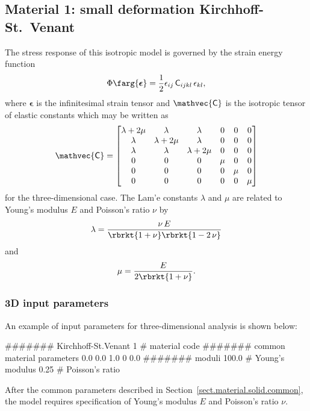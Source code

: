 \subsection{Material 1: small deformation Kirchhoff-St.~Venant}
\label{sect.mat.SSKStV}
The stress response of this isotropic model is 
governed by the strain energy function
\begin{equation}
\Phi\farg{\boldsymbol{\epsilon}}=
\frac{1}{2} \epsilon_{ij}\,\mathsf{C}_{ijkl}\,\epsilon_{kl},
\end{equation}
where $\boldsymbol{\epsilon}$ is the infinitesimal strain tensor
and $\mathvec{\mathsf{C}}$
is the isotropic tensor of elastic constants which may be
written as
\begin{equation}
\label{eq.modulus.isotropic}
	\mathvec{\mathsf{C}} =
	\begin{bmatrix}
		\lambda + 2 \mu & \lambda & \lambda & 0 & 0 & 0 \\
		\lambda & \lambda + 2 \mu & \lambda & 0 & 0 & 0 \\
		\lambda & \lambda & \lambda + 2 \mu & 0 & 0 & 0 \\
		0 & 0 & 0 & \mu & 0 & 0 \\
		0 & 0 & 0 & 0 & \mu & 0 \\
		0 & 0 & 0 & 0 & 0 & \mu
	\end{bmatrix}
\end{equation}
for the three-dimensional case. The Lam\a'e constants $\lambda$ and 
$\mu$ are related to Young's modulus $E$ 
and Poisson's ratio $\nu$ by
\begin{equation}
\label{eq.lambda}
\lambda = \frac{\nu\,E}{\rbrkt{1 + \nu}\rbrkt{1 - 2\,\nu}}
\end{equation}
and
\begin{equation}
\label{eq.mu}
\mu = \frac{E}{2 \rbrkt{1 + \nu}}.
\end{equation}

\subsubsection{3D input parameters}
An example of input parameters for three-dimensional analysis is shown 
below:
\begin{inputfile}
####### Kirchhoff-St.Venant
1     # material code
####### common material parameters
0.0    0.0    1.0
0      0.0
####### moduli
100.0 # Young's modulus
0.25  # Poisson's ratio
\end{inputfile}
After the common parameters described in 
Section~\ref{sect.material.solid.common}, the 
model requires specification of Young's modulus 
$E$ and Poisson's 
ratio $\nu$.

